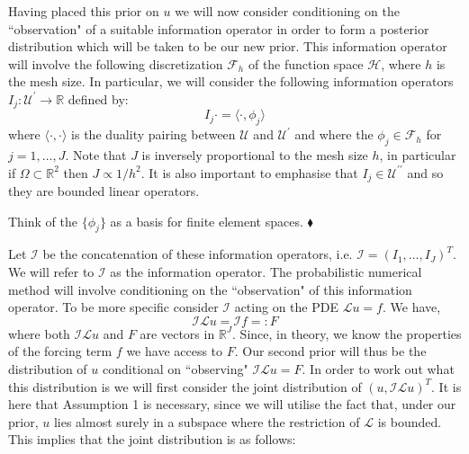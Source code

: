 Having placed this prior on $u$ we will now consider conditioning on the ``observation" of a suitable information operator in order to form a posterior distribution which will be taken to be our new prior. This information operator will involve the following discretization $\mathcal{F}_{h}$ of the function space $\mathcal{H}$, where $h$ is the mesh size. In particular, we will consider the following information operators $I_{j}:\mathcal{U}^{\prime}\rightarrow\mathbb{R}$ defined by:
\begin{equation*}
    I_{j}\boldsymbol{\cdot} = \langle\boldsymbol{\cdot},\phi_{j}\rangle
\end{equation*}
where $\langle\boldsymbol{\cdot},\boldsymbol{\cdot}\rangle$ is the duality pairing between $\mathcal{U}$ and $\mathcal{U}^{\prime}$ and where the $\phi_{j}\in\mathcal{F}_{h}$ for $j=1,\dots,J$. Note that $J$ is inversely proportional to the mesh size $h$, in particular if $\Omega\subset\mathbb{R}^{2}$ then $J\propto 1/h^2$. It is also important to emphasise that $I_{j}\in\mathcal{U}^{\prime\prime}$ and so they are bounded linear operators.
\begin{remark}
    Think of the $\{\phi_{j}\}$ as a basis for finite element spaces.
    $\mathbin{\blacklozenge}$
\end{remark}
Let $\mathcal{I}$ be the concatenation of these information operators, i.e. $\mathcal{I}=(I_1,\dots,I_J)^{T}$. We will refer to $\mathcal{I}$ as the information operator. The probabilistic numerical method will involve conditioning on the ``observation" of this information operator. To be more specific consider $\mathcal{I}$ acting on the PDE $\mathcal{L}u=f$. We have,
\begin{equation*}
    \mathcal{I}\mathcal{L}u=\mathcal{I}f=:F
\end{equation*}
where both $\mathcal{I}\mathcal{L}u$ and $F$ are vectors in $\mathbb{R}^{J}$. Since, in theory, we know the properties of the forcing term $f$ we have access to $F$. Our second prior will thus be the distribution of $u$ conditional on ``observing" $\mathcal{I}\mathcal{L}u=F$. In order to work out what this distribution is we will first consider the joint distribution of $(u,\mathcal{I}\mathcal{L}u)^{T}$. It is here that Assumption 1 is necessary, since we will utilise the fact that, under our prior, $u$ lies almost surely in a subspace where the restriction of $\mathcal{L}$ is bounded. This implies that the joint distribution is as follows:
